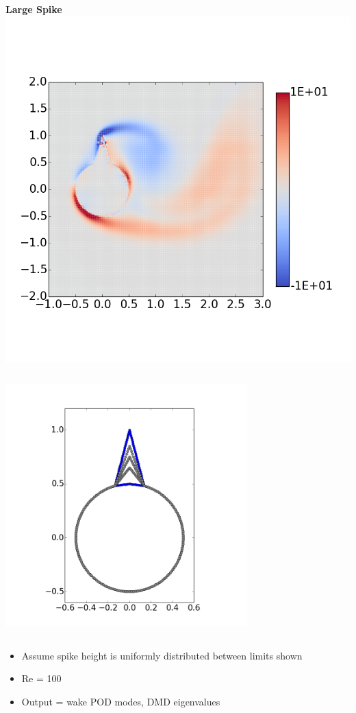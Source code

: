 \documentclass[9pt]{beamer}
\begin{document}
\begin{frame}
\begin{columns}[c]
   \centering
    \textbf{Large Spike} \\
    \includegraphics[width=1\textwidth]{PerturbBigHorn}
\end{columns}

\begin{columns}[c]
   \centering
{}
   \centering
    \includegraphics[width=0.7\textwidth]{CylinderPerturbations}
   \centering
\end{columns}
\begin{itemize}
\item Assume spike height is uniformly distributed between limits shown
\item Re = 100
\item Output = wake POD modes, DMD eigenvalues
\end{itemize}
\end{frame}
\end{document}
